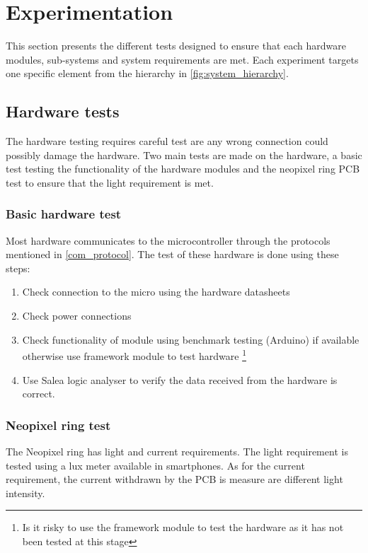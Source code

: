 \section{Experimentation}
This section presents the different tests designed to ensure that each hardware modules, sub-systems and system requirements are met. Each experiment targets one specific element from the hierarchy in \cref{fig:system_hierarchy}.
\subsection{Hardware tests}
The hardware testing requires careful test are any wrong connection could possibly damage the hardware. Two main tests are made on the hardware, a basic test testing the functionality of the hardware modules and the neopixel ring PCB test to ensure that the light requirement is met.
\subsubsection{Basic hardware test}
Most hardware communicates to the microcontroller through the protocols mentioned in \cref{com_protocol}. The test of these hardware is done using these steps:
\begin{enumerate}
\item Check connection to the micro using the hardware datasheets
\item Check power connections
\item Check functionality of module using benchmark testing (Arduino) if available otherwise use framework module to test hardware \footnote{Is it risky to use the framework module to test the hardware as it has not been tested at this stage}
\item Use Salea logic analyser to verify the data received from the hardware is correct.
\end{enumerate} 
\subsubsection{Neopixel ring test}
The Neopixel ring has light and current requirements. The light requirement is tested using a lux meter available in smartphones. As for the current requirement, the current withdrawn by the PCB is measure are different light intensity. 

